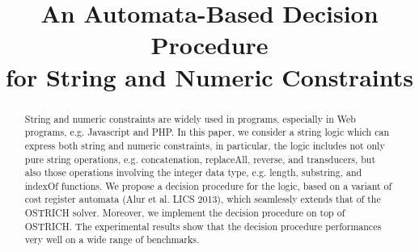 \documentclass{llncs}
\title{An Automata-Based Decision Procedure \\
for String and Numeric Constraints}
\author{}
\institute{ }
\begin{document}
%
%

\maketitle

\begin{abstract}
String and numeric constraints are widely used in programs, especially in Web programs, e.g. Javascript and PHP. 
In this paper, we consider a string logic which can express both string and numeric constraints, in particular, the logic includes not only pure string operations, e.g. concatenation, replaceAll, reverse, and transducers, but also those operations involving the integer data type, e.g. length, substring, and indexOf functions.  
We propose a decision procedure for the logic, based on a variant of cost register automata (Alur et al. LICS 2013), which seamlessly extends that of the OSTRICH solver. Moreover, we implement the decision procedure on top of OSTRICH. The experimental results show that the decision procedure performances very well on a wide range of benchmarks. 
\end{abstract}

%
%
\end{document}
